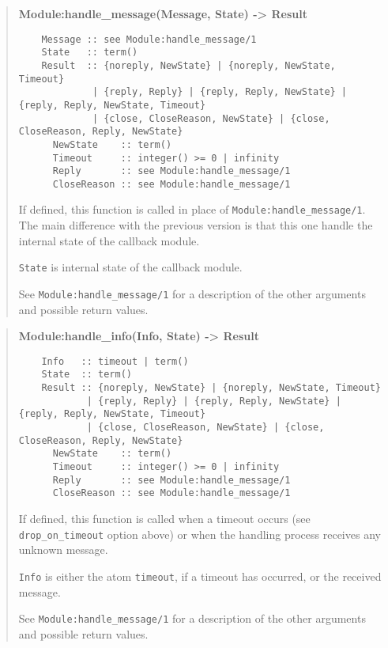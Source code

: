 \documentclass[11pt,oneside,english]{book}
\begin{document}
\begin{quote}
  \textbf{Module:handle\_message(Message, State) -> Result}
\begin{verbatim}
    Message :: see Module:handle_message/1
    State   :: term()
    Result  :: {noreply, NewState} | {noreply, NewState, Timeout}
             | {reply, Reply} | {reply, Reply, NewState} | {reply, Reply, NewState, Timeout}
             | {close, CloseReason, NewState} | {close, CloseReason, Reply, NewState}
      NewState    :: term()
      Timeout     :: integer() >= 0 | infinity
      Reply       :: see Module:handle_message/1
      CloseReason :: see Module:handle_message/1
\end{verbatim}

  If defined, this function is called in place of
  \verb+Module:handle_message/1+. The main difference with the previous version
  is that this one handle the internal state of the callback module.

  \verb+State+ is internal state of the callback module.

  See \verb+Module:handle_message/1+ for a description of the other arguments
  and possible return values.
\end{quote}

\begin{quote}
  \textbf{Module:handle\_info(Info, State) -> Result}
\begin{verbatim}
    Info   :: timeout | term()
    State  :: term()
    Result :: {noreply, NewState} | {noreply, NewState, Timeout}
            | {reply, Reply} | {reply, Reply, NewState} | {reply, Reply, NewState, Timeout}
            | {close, CloseReason, NewState} | {close, CloseReason, Reply, NewState}
      NewState    :: term()
      Timeout     :: integer() >= 0 | infinity
      Reply       :: see Module:handle_message/1
      CloseReason :: see Module:handle_message/1
\end{verbatim}

  If defined, this function is called when a timeout occurs (see
  \verb+drop_on_timeout+ option above) or when the handling process receives any
  unknown message.

  \verb+Info+ is either the atom \verb+timeout+, if a timeout has occurred, or
  the received message.

  See \verb+Module:handle_message/1+ for a description of the other arguments
  and possible return values.
\end{quote}
\end{document}
